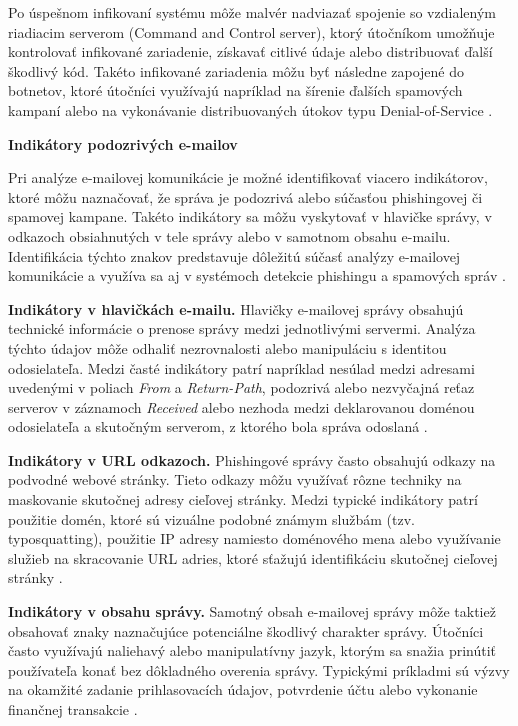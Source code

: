 \documentclass[conference]{IEEEtran}
\begin{document}
Po úspešnom infikovaní systému môže malvér nadviazať spojenie
so vzdialeným riadiacim serverom (Command and Control server),
ktorý útočníkom umožňuje kontrolovať infikované zariadenie,
získavať citlivé údaje alebo distribuovať ďalší škodlivý kód.
Takéto infikované zariadenia môžu byť následne zapojené do
botnetov, ktoré útočníci využívajú napríklad na šírenie ďalších
spamových kampaní alebo na vykonávanie distribuovaných
útokov typu Denial-of-Service \cite{aurangzeb2017ransomware}. 



\textbf{Indikátory podozrivých e-mailov}

Pri analýze e-mailovej komunikácie je možné identifikovať viacero
indikátorov, ktoré môžu naznačovať, že správa je podozrivá alebo
súčasťou phishingovej či spamovej kampane. Takéto indikátory sa môžu
vyskytovať v hlavičke správy, v odkazoch obsiahnutých v tele správy
alebo v samotnom obsahu e-mailu. Identifikácia týchto znakov predstavuje
dôležitú súčasť analýzy e-mailovej komunikácie a využíva sa aj v
systémoch detekcie phishingu a spamových správ \cite{jakobsson2007phishing,verma2017phishing}.

\textbf{Indikátory v hlavičkách e-mailu.}
Hlavičky e-mailovej správy obsahujú technické informácie o prenose
správy medzi jednotlivými servermi. Analýza týchto údajov môže odhaliť
nezrovnalosti alebo manipuláciu s identitou odosielateľa. Medzi
časté indikátory patrí napríklad nesúlad medzi adresami uvedenými
v poliach \textit{From} a \textit{Return-Path}, podozrivá alebo
nezvyčajná reťaz serverov v záznamoch \textit{Received} alebo
nezhoda medzi deklarovanou doménou odosielateľa a skutočným
serverom, z ktorého bola správa odoslaná \cite{jakobsson2007phishing}.

\textbf{Indikátory v URL odkazoch.}
Phishingové správy často obsahujú odkazy na podvodné webové stránky.
Tieto odkazy môžu využívať rôzne techniky na maskovanie skutočnej
adresy cieľovej stránky. Medzi typické indikátory patrí použitie
domén, ktoré sú vizuálne podobné známym službám (tzv. typosquatting),
použitie IP adresy namiesto doménového mena alebo využívanie služieb
na skracovanie URL adries, ktoré sťažujú identifikáciu skutočnej
cieľovej stránky \cite{verma2017phishing}.

\textbf{Indikátory v obsahu správy.}
Samotný obsah e-mailovej správy môže taktiež obsahovať znaky
naznačujúce potenciálne škodlivý charakter správy. Útočníci často
využívajú naliehavý alebo manipulatívny jazyk, ktorým sa snažia
prinútiť používateľa konať bez dôkladného overenia správy.
Typickými príkladmi sú výzvy na okamžité zadanie prihlasovacích
údajov, potvrdenie účtu alebo vykonanie finančnej transakcie
\cite{jakobsson2007phishing}.
\end{document}
